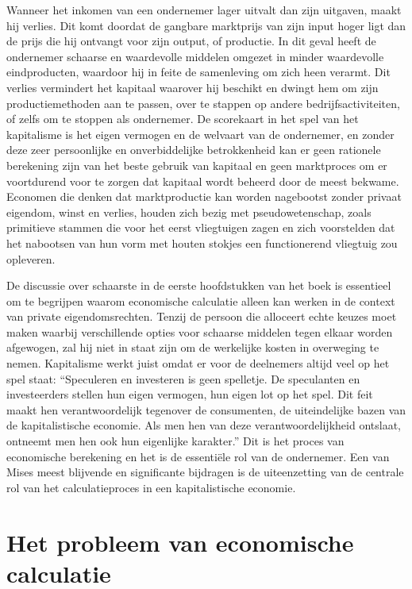 Wanneer het inkomen van een ondernemer lager uitvalt dan zijn uitgaven, maakt hij verlies. Dit komt doordat de gangbare marktprijs van zijn input hoger ligt dan de prijs die hij ontvangt voor zijn output, of productie. In dit geval heeft de ondernemer schaarse en waardevolle middelen omgezet in minder waardevolle eindproducten, waardoor hij in feite de samenleving om zich heen verarmt. Dit verlies vermindert het kapitaal waarover hij beschikt en dwingt hem om zijn productiemethoden aan te passen, over te stappen op andere bedrijfsactiviteiten, of zelfs om te stoppen als ondernemer. De scorekaart in het spel van het kapitalisme is het eigen vermogen en de welvaart van de ondernemer, en zonder deze zeer persoonlijke en onverbiddelijke betrokkenheid kan er geen rationele berekening zijn van het beste gebruik van kapitaal en geen marktproces om er voortdurend voor te zorgen dat kapitaal wordt beheerd door de meest bekwame. Economen die denken dat marktproductie kan worden nagebootst zonder privaat eigendom, winst en verlies, houden zich bezig met pseudowetenschap, zoals primitieve stammen die voor het eerst vliegtuigen zagen en zich voorstelden dat het nabootsen van hun vorm met houten stokjes een functionerend vliegtuig zou opleveren.

De discussie over schaarste in de eerste hoofdstukken van het boek is essentieel om te begrijpen waarom economische calculatie alleen kan werken in de context van private eigendomsrechten. Tenzij de persoon die alloceert echte keuzes moet maken waarbij verschillende opties voor schaarse middelen tegen elkaar worden afgewogen, zal hij niet in staat zijn om de werkelijke kosten in overweging te nemen. Kapitalisme werkt juist omdat er voor de deelnemers altijd veel op het spel staat: ``Speculeren en investeren is geen spelletje. De speculanten en investeerders stellen hun eigen vermogen, hun eigen lot op het spel. Dit feit maakt hen verantwoordelijk tegenover de consumenten, de uiteindelijke bazen van de kapitalistische economie. Als men hen van deze verantwoordelijkheid ontslaat, ontneemt men hen ook hun eigenlijke karakter.''\autocite{136} Dit is het proces van economische berekening en het is de essentiële rol van de ondernemer. Een van Mises\textquotesingle{} meest blijvende en significante bijdragen is de uiteenzetting van de centrale rol van het calculatieproces in een kapitalistische economie.

\hypertarget{het-probleem-van-economische-berekening}{%
\section{Het probleem van economische calculatie}\label{het-probleem-van-economische-berekening}}

